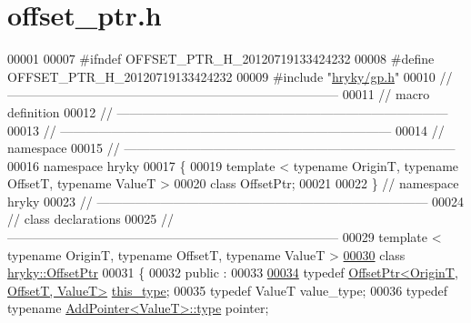 \hypertarget{offset__ptr_8h_source}{\section{offset\-\_\-ptr.\-h}
}

\begin{DoxyCode}
00001 
00007 \textcolor{preprocessor}{#ifndef OFFSET\_PTR\_H\_20120719133424232}
00008 \textcolor{preprocessor}{}\textcolor{preprocessor}{#define OFFSET\_PTR\_H\_20120719133424232}
00009 \textcolor{preprocessor}{}\textcolor{preprocessor}{#include "\hyperlink{gp_8h}{hryky/gp.h}"}
00010 \textcolor{comment}{//
      ------------------------------------------------------------------------------}
00011 \textcolor{comment}{// macro definition}
00012 \textcolor{comment}{//
      ------------------------------------------------------------------------------}
00013 \textcolor{comment}{//
      ------------------------------------------------------------------------------}
00014 \textcolor{comment}{// namespace}
00015 \textcolor{comment}{//
      ------------------------------------------------------------------------------}
00016 \textcolor{keyword}{namespace }hryky
00017 \{
00019     \textcolor{keyword}{template} < \textcolor{keyword}{typename} OriginT, \textcolor{keyword}{typename} OffsetT, \textcolor{keyword}{typename} ValueT >
00020     \textcolor{keyword}{class }OffsetPtr;
00021 
00022 \} \textcolor{comment}{// namespace hryky}
00023 \textcolor{comment}{//
      ------------------------------------------------------------------------------}
00024 \textcolor{comment}{// class declarations}
00025 \textcolor{comment}{//
      ------------------------------------------------------------------------------}
00029 \textcolor{comment}{}\textcolor{keyword}{template} < \textcolor{keyword}{typename} OriginT, \textcolor{keyword}{typename} OffsetT, \textcolor{keyword}{typename} ValueT >
\hypertarget{offset__ptr_8h_source_l00030}{}\hyperlink{classhryky_1_1_offset_ptr}{00030} \textcolor{keyword}{class }\hyperlink{classhryky_1_1_offset_ptr}{hryky::OffsetPtr}
00031 \{
00032 \textcolor{keyword}{public} :
00033 
\hypertarget{offset__ptr_8h_source_l00034}{}\hyperlink{classhryky_1_1_offset_ptr_a73a85221d5352162be046159f4aea008}{00034}     \textcolor{keyword}{typedef} \hyperlink{classhryky_1_1_offset_ptr}{OffsetPtr<OriginT, OffsetT, ValueT>}     \hyperlink{classhryky_1_1_offset_ptr_a73a85221d5352162be046159f4aea008}{this_type};
00035     \textcolor{keyword}{typedef} ValueT                                  value\_type;
00036     \textcolor{keyword}{typedef} \textcolor{keyword}{typename} \hyperlink{classhryky_1_1_add_pointer_a02d0c31ee76f5cb3f0ba3ca4c01fc8d3}{AddPointer<ValueT>::type}       pointer;

\end{DoxyCode}
